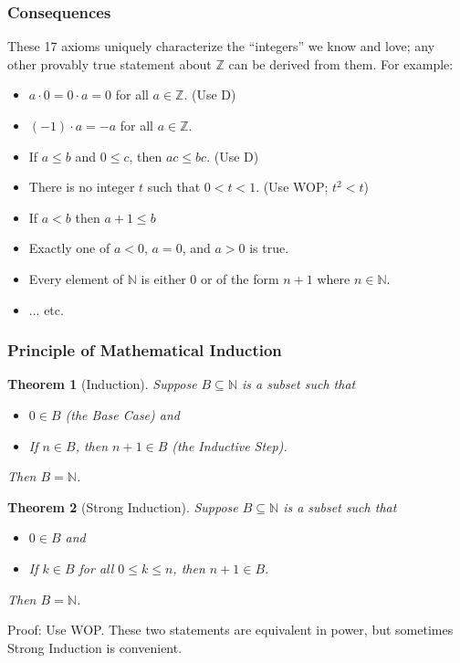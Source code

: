 \documentclass[handout]{beamer}
\newtheorem{thm}{Theorem}
\begin{document}
\begin{frame}
\frametitle{Consequences}

These 17 axioms uniquely characterize the ``integers'' we know and love; any other provably true statement about $\mathbb{Z}$ can be derived from them. For example: \pause

\begin{itemize}
\item $a \cdot 0 = 0 \cdot a = 0$ for all $a \in \mathbb{Z}$. \pause (Use D) \pause
\item $(-1) \cdot a = -a$ for all $a \in \mathbb{Z}$. \pause
\item If $a \leq b$ and $0 \leq c$, then $ac \leq bc$. \pause (Use D) \pause
\item There is no integer $t$ such that $0 < t < 1$. \pause (Use WOP; $t^2 < t$) \pause
\item If $a < b$ then $a+1 \leq b$ \pause
\item Exactly one of $a < 0$, $a = 0$, and $a > 0$ is true. \pause
\item Every element of $\mathbb{N}$ is either 0 or of the form $n+1$ where $n \in \mathbb{N}$. \pause
\item ... etc.
\end{itemize}
\end{frame}



\begin{frame}
\frametitle{Principle of Mathematical Induction}

\begin{thm}[Induction]
Suppose $B \subseteq \mathbb{N}$ is a subset such that
\begin{itemize}
\item $0 \in B$ (the \emph{Base Case}) and
\item If $n \in B$, then $n + 1 \in B$ (the \emph{Inductive Step}).
\end{itemize}
Then $B = \mathbb{N}$.
\end{thm}

\begin{thm}[Strong Induction]
Suppose $B \subseteq \mathbb{N}$ is a subset such that
\begin{itemize}
\item $0 \in B$ and
\item If $k \in B$ for all $0 \leq k \leq n$, then $n+1 \in B$.
\end{itemize}
Then $B = \mathbb{N}$.
\end{thm}

Proof: Use WOP. These two statements are equivalent in power, but sometimes Strong Induction is convenient.
\end{frame}
\end{document}
